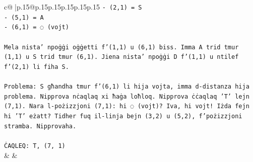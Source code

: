\documentclass{article}
\begin{document}
{\begin{supertabular}{c@{$\;$}|p{.15\linewidth}@{}p{.15\linewidth}p{.15\linewidth}p{.15\linewidth}p{.15\linewidth}p{.15\linewidth}}
{{{\texttt{{-} (2,1) = S} \\
\texttt{{-} (5,1) = A} \\
\texttt{{-} (6,1) = ◌ (vojt)} \\
\\ 
\texttt{Mela nista' npoġġi oġġetti f'(1,1) u (6,1) biss. Imma A trid tmur (1,1) u S trid tmur (6,1). Jiena nista' npoġġi D f'(1,1) u ntilef f'(2,1) li fiha S.} \\
\\ 
\texttt{Problema: S għandha tmur f'(6,1) li hija vojta, imma d{-}distanza hija problema. Nipprova nċaqlaq xi ħaġa loħloq. Nipprova ċċaqlaq 'T' lejn (7,1). Nara l{-}pożizzjoni (7,1): hi ◌ (vojt)? Iva, hi vojt! Iżda fejn hi 'T' eżatt? Tidher fuq il{-}linja bejn (3,2) u (5,2), f'pożizzjoni stramba. Nipprovaha.} \\
\\ 
\texttt{ĊAQLEQ: T, (7, 1)} \\
            }
        }
    }
    & & \\ \\


\end{supertabular}}
\end{document}
